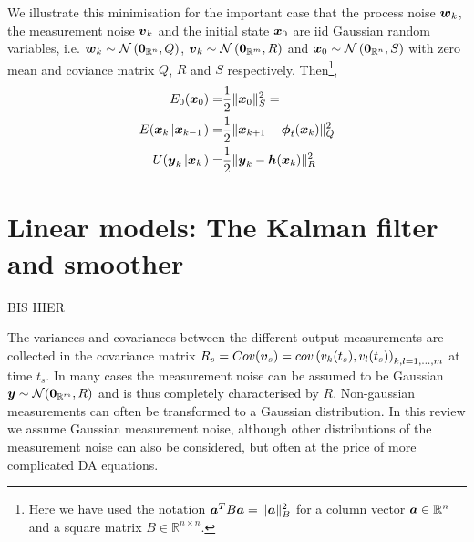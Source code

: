 \documentclass[10pt,a4paper, twocolumn]{article}
\renewcommand{\vec}[1]{{\mbox{\mathversion{bold}\ensuremath{#1}}}}
\begin{document}
We illustrate this minimisation for the important case that  the process noise $\vec{w}_k$, the measurement noise $\vec{v}_k$ and the initial state $\vec{x}_0$ are iid Gaussian random variables, i.e.   $\vec{w}_k\sim \mathcal{N}\left(\vec{0}_{\mathbb{R}^n},Q\right)$, $\vec{v}_k\sim \mathcal{N}\left(\vec{0}_{\mathbb{R}^m},R\right)$ and $\vec{x}_0\sim \mathcal{N}\left(\vec{0}_{\mathbb{R}^n},S\right)$ with zero mean and coviance matrix $Q$, $R$ and $S$ respectively. Then\footnote{Here we have used the notation $\vec{a}^T B \vec{a}=\|\vec{a}\|^2_B$ for a column vector $\vec{a}\in \mathbb{R}^n$ and a square matrix $B\in \mathbb{R}^{n \times n}$.}, 
%
\begin{align}\label{eq:log_probs_gaussian}
E_0(\vec{x}_0) =& \frac{1}{2} \|\vec{x}_0\|^2_S=\\
E(\vec{x}_k\left| \vec{x}_{k-1}\right.) =& \frac{1}{2}\|\vec{x}_{k+1}-\vec{\phi}_t (\vec{x}_k)\|^2_Q\\
U(\vec{y}_k\left| \vec{x}_k\right.)=&\frac{1}{2}\|\vec{y}_k-\vec{h} (\vec{x}_k)\|^2_R
\end{align}







\section{Linear models: The Kalman filter and smoother}


 









BIS HIER
\newpage







The variances and covariances between the different output measurements are collected in the covariance matrix $R_s=Cov(\vec{v}_s)=cov\left(v_k(t_s),v_l(t_s)\right)_{k,l=1,\ldots,m}$ at time $t_s$. In many cases the measurement noise can be assumed to be Gaussian $\vec{y}\sim	\mathcal{N}(\vec{0}_{\mathbb{R}^m}, R)$ and is thus completely characterised by $R$. Non-gaussian measurements can often be transformed to a Gaussian distribution. In this review we assume Gaussian measurement noise, although other distributions of the  measurement noise can also be considered, but often at the price of more complicated DA equations. 
\end{document}
